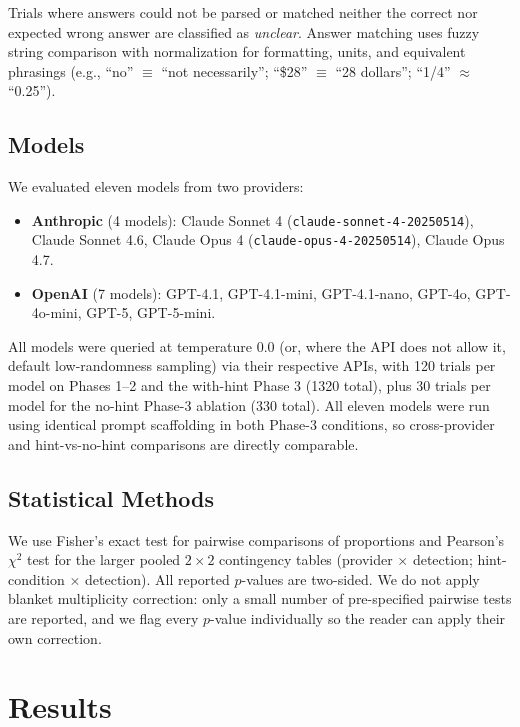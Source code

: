 \documentclass{article}
\begin{document}
Trials where answers could not be parsed or matched neither the correct nor expected wrong answer are classified as \emph{unclear}. Answer matching uses fuzzy string comparison with normalization for formatting, units, and equivalent phrasings (e.g., ``no'' $\equiv$ ``not necessarily''; ``\$28'' $\equiv$ ``28 dollars''; ``1/4'' $\approx$ ``0.25'').

\subsection{Models}

We evaluated eleven models from two providers:
\begin{itemize}
    \item \textbf{Anthropic} (4 models): Claude Sonnet 4 (\texttt{claude-sonnet-4-20250514}), Claude Sonnet 4.6, Claude Opus 4 (\texttt{claude-opus-4-20250514}), Claude Opus 4.7.
    \item \textbf{OpenAI} (7 models): GPT-4.1, GPT-4.1-mini, GPT-4.1-nano, GPT-4o, GPT-4o-mini, GPT-5, GPT-5-mini.
\end{itemize}

All models were queried at temperature 0.0 (or, where the API does not allow it, default low-randomness sampling) via their respective APIs, with 120 trials per model on Phases 1--2 and the with-hint Phase 3 (1320 total), plus 30 trials per model for the no-hint Phase-3 ablation (330 total). All eleven models were run using identical prompt scaffolding in both Phase-3 conditions, so cross-provider and hint-vs-no-hint comparisons are directly comparable.

\subsection{Statistical Methods}

We use Fisher's exact test for pairwise comparisons of proportions and Pearson's $\chi^2$ test for the larger pooled $2\times2$ contingency tables (provider $\times$ detection; hint-condition $\times$ detection). All reported $p$-values are two-sided. We do not apply blanket multiplicity correction: only a small number of pre-specified pairwise tests are reported, and we flag every $p$-value individually so the reader can apply their own correction.

\section{Results}
\label{sec:results}
\end{document}
